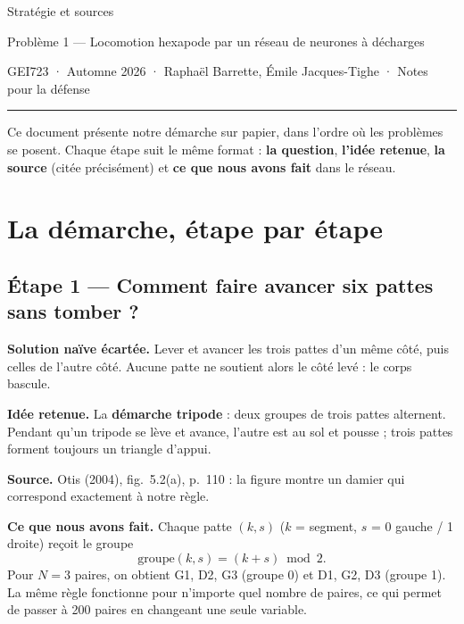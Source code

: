 \documentclass[11pt]{article}
\newcommand{\champ}[2]{\par\noindent\textbf{\color{bleu}#1} #2\par}
\begin{document}
{\condensed\fontsize{24pt}{28pt}\selectfont Stratégie et sources\par}
\vspace{0.3em}
{\large Problème 1 --- Locomotion hexapode par un réseau de neurones à décharges\par}
\vspace{0.2em}
{\color{gris} GEI723 · Automne 2026 · Raphaël Barrette, Émile Jacques-Tighe · Notes pour la défense\par}
\vspace{0.8em}
\hrule
\vspace{0.6em}

Ce document présente notre démarche sur papier, dans l'ordre où les problèmes se posent. Chaque étape
suit le même format : \textbf{la question}, \textbf{l'idée retenue}, \textbf{la source} (citée
précisément) et \textbf{ce que nous avons fait} dans le réseau.

\section{La démarche, étape par étape}

\subsection*{Étape 1 --- Comment faire avancer six pattes sans tomber ?}

\champ{Solution naïve écartée.}{Lever et avancer les trois pattes d'un même côté, puis celles de
l'autre côté. Aucune patte ne soutient alors le côté levé : le corps bascule.}
\champ{Idée retenue.}{La \textbf{démarche tripode} : deux groupes de trois pattes alternent. Pendant
qu'un tripode se lève et avance, l'autre est au sol et pousse ; trois pattes forment toujours un
triangle d'appui.}
\champ{Source.}{Otis (2004), fig.~5.2(a), p.~110 \cite{otis2004} : la figure montre un damier
qui correspond exactement à notre règle.}
\champ{Ce que nous avons fait.}{Chaque patte $(k, s)$ ($k$ = segment, $s$ = 0 gauche / 1 droite)
reçoit le groupe
\[ \text{groupe}(k, s) = (k + s) \bmod 2 . \]
Pour $N = 3$ paires, on obtient G1, D2, G3 (groupe 0) et D1, G2, D3 (groupe 1). La même règle
fonctionne pour n'importe quel nombre de paires, ce qui permet de passer à 200 paires en changeant
une seule variable.}

\end{document}
